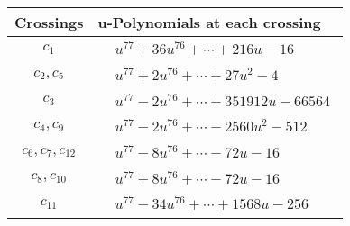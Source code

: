 \documentclass[1p]{elsarticle_modified}
\theoremstyle{definition}
\begin{document}
\begin{tabular}{m{50pt}|m{274pt}}
Crossings & \hspace{64pt}u-Polynomials at each crossing \\
\hline $$\begin{aligned}c_{1}\end{aligned}$$&$\begin{aligned}
&u^{77}+36 u^{76}+\cdots+216 u-16
\end{aligned}$\\
\hline $$\begin{aligned}c_{2},c_{5}\end{aligned}$$&$\begin{aligned}
&u^{77}+2 u^{76}+\cdots+27 u^2-4
\end{aligned}$\\
\hline $$\begin{aligned}c_{3}\end{aligned}$$&$\begin{aligned}
&u^{77}-2 u^{76}+\cdots+351912 u-66564
\end{aligned}$\\
\hline $$\begin{aligned}c_{4},c_{9}\end{aligned}$$&$\begin{aligned}
&u^{77}-2 u^{76}+\cdots-2560 u^2-512
\end{aligned}$\\
\hline $$\begin{aligned}c_{6},c_{7},c_{12}\end{aligned}$$&$\begin{aligned}
&u^{77}-8 u^{76}+\cdots-72 u-16
\end{aligned}$\\
\hline $$\begin{aligned}c_{8},c_{10}\end{aligned}$$&$\begin{aligned}
&u^{77}+8 u^{76}+\cdots-72 u-16
\end{aligned}$\\
\hline $$\begin{aligned}c_{11}\end{aligned}$$&$\begin{aligned}
&u^{77}-34 u^{76}+\cdots+1568 u-256
\end{aligned}$\\
\hline
\end{tabular}\\~\\
\newpage\renewcommand{\arraystretch}{1}
\end{document}
